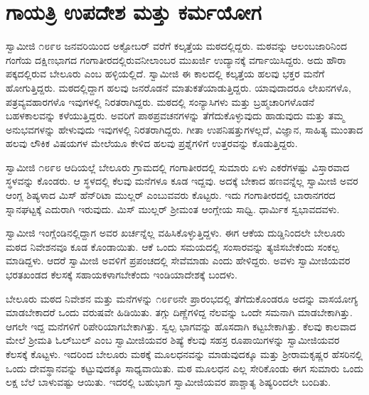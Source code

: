
\chapter{ಗಾಯತ್ರಿ ಉಪದೇಶ ಮತ್ತು ಕರ್ಮಯೋಗ}

 ಸ್ವಾಮೀಜಿ ೧೮೯೮ ಜನವರಿಯಿಂದ ಅಕ್ಟೋಬರ್ ವರೆಗೆ ಕಲ್ಕತ್ತೆಯ ಮಠದಲ್ಲಿದ್ದರು. ಮಠವನ್ನು ಆಲಂಬಜಾರಿನಿಂದ ಗಂಗೆಯ ದಕ್ಷಿಣಭಾಗದ ಗಂಗಾತೀರದಲ್ಲಿರುವ\break ನೀಲಾಂಬರ ಮುಖರ್ಜಿ ಉದ್ಯಾನಕ್ಕೆ ವರ್ಗಾಯಿಸಿದ್ದರು. ಅದು ಹೌರಾ ಪಕ್ಕದಲ್ಲಿರುವ ಬೇಲೂರು ಎಂಬ ಹಳ್ಳಿಯಲ್ಲಿದೆ. ಸ್ವಾಮೀಜಿ ಈ ಕಾಲದಲ್ಲಿ ಕಲ್ಕತ್ತೆಯ ಹಲವು ಭಕ್ತರ ಮನೆಗೆ ಹೋಗುತ್ತಿದ್ದರು. ಮಠದಲ್ಲಿದ್ದಾಗ ಹಲವು ಜನರೊಡನೆ ಮಾತುಕತೆಯಾಡುತ್ತಿದ್ದರು. ಯಾವುದಾದರೂ ಲೇಖನಗಳೊ, ಪತ್ರವ್ಯವಹಾರಗಳೊ ಇವುಗಳಲ್ಲಿ ನಿರತರಾಗಿದ್ದರು. ಮಠದಲ್ಲಿ ಸಂನ್ಯಾಸಿಗಳು ಮತ್ತು ಬ್ರಹ್ಮಚಾರಿಗಳೊಡನೆ ಬಹಳ\break ಕಾಲವನ್ನು ಕಳೆಯುತ್ತಿದ್ದರು. ಅವರಿಗೆ ಪಾಠಪ್ರವಚನಗಳನ್ನು ತೆಗೆದುಕೊಳ್ಳುವುದು ಹಾಡುವುದು ಮತ್ತು ತಮ್ಮ ಅನುಭವಗಳನ್ನು ಹೇಳುವುದು ಇವುಗಳಲ್ಲಿ ನಿರತರಾಗಿದ್ದರು. ಗೀತಾ ಉಪನಿಷತ್ತುಗಳಲ್ಲದೆ, ವಿಜ್ಞಾನ, ಸಾಹಿತ್ಯ ಮುಂತಾದ ಹಲವು ಲೌಕಿಕ ವಿಷಯಗಳ ಮೇಲೆಯೂ ಕೇಳಿದ ಹಲವು ಪ್ರಶ್ನೆಗಳಿಗೆ ಉತ್ತರವನ್ನು ಕೊಡುತ್ತಿದ್ದರು. 

 ಸ್ವಾಮೀಜಿ ೧೮೯೮ ಆದಿಯಲ್ಲೆ ಬೇಲೂರು ಗ್ರಾಮದಲ್ಲಿ ಗಂಗಾತೀರದಲ್ಲಿ ಸುಮಾರು ಏಳು ಎಕರೆಗಳಷ್ಟು ವಿಸ್ತಾರವಾದ ಸ್ಥಳವನ್ನು ಕೊಂಡರು. ಆ ಸ್ಥಳದಲ್ಲಿ ಕೆಲವು ಮನೆಗಳೂ ಕೂಡ ಇದ್ದವು. ಅದಕ್ಕೆ ಬೇಕಾದ ಹಣವನ್ನೆಲ್ಲ ಸ್ವಾಮೀಜಿ ಅವರ ಆಂಗ್ಲ ಶಿಷ್ಯಳಾದ ಮಿಸ್ ಹೆನ್‍ರಿಟಾ ಮುಲ್ಲರ್ ಎಂಬುವವರು ಕೊಟ್ಟರು. ಇದು ಗಂಗಾತೀರದಲ್ಲಿ ಬಾರಾನಗರದ ಸ್ನಾನಘಟ್ಟಕ್ಕೆ ಎದುರಾಗಿ ಇರುವುದು. ಮಿಸ್ ಮುಲ್ಲರ್ ಶ‍್ರೀಮಂತ ಆಂಗ್ಲೇಯ ಸಾಧ್ವಿ. ಧಾರ್ಮಿಕ ಸ್ವಭಾವದವಳು. 

 ಸ್ವಾಮೀಜಿ ಇಂಗ್ಲೆಂಡಿನಲ್ಲಿದ್ದಾಗ ಅವರ ಖರ್ಚನ್ನೆಲ್ಲ ವಹಿಸಿಕೊಳ್ಳುತ್ತಿದ್ದಳು. ಈಗ ಆಕೆಯ ದುಡ್ಡಿನಿಂದಲೇ‌ ಬೇಲೂರು ಮಠದ ನಿವೇಶನವೂ ಕೂಡ ಕೊಂಡಾಯಿತು. ಆಕೆ ಒಂದು ಸಮಯದಲ್ಲಿ ಸಂಸಾರವನ್ನು ತ್ಯಜಿಸಬೇಕೆಂದು ಸಂಕಲ್ಪ ಮಾಡಿದ್ದಳು. ಆದರೆ ಸ್ವಾಮೀಜಿ ಅವಳಿಗೆ ಪ್ರಪಂಚದಲ್ಲಿ ಸೇವೆಮಾಡು ಎಂದು ಹೇಳಿದ್ದರು. ಅವಳು ಸ್ವಾಮೀಜಿಯವರ ಭರತಖಂಡದ ಕೆಲಸಕ್ಕೆ ಸಹಾಯಕಳಾಗಬೇಕೆಂದು ಇಂಡಿಯಾದೇಶಕ್ಕೆ ಬಂದಳು. 

 ಬೇಲೂರು ಮಠದ ನಿವೇಶನ ಮತ್ತು ಮನೆಗಳನ್ನು ೧೮೯೮ನೇ ಪ್ರಾರಂಭದಲ್ಲಿ ತೆಗೆದುಕೊಂಡರೂ ಅದನ್ನು ವಾಸಯೋಗ್ಯ ಮಾಡಬೇಕಾದರೆ ಒಂದು ವರುಷವೇ ಹಿಡಿಯಿತು. ತಗ್ಗು ದಿಣ್ಣೆಗಳಿದ್ದ ನೆಲವನ್ನು ಒಂದೇ ಸಮನಾಗಿ ಮಾಡಬೇಕಾಗಿತ್ತು. ಆಗಲೇ ಇದ್ದ ಮನೆಗಳಿಗೆ ರಿಪೇರಿಯಾಗಬೇಕಾಗಿತ್ತು. ಸ್ವಲ್ಪ ಭಾಗವನ್ನು ಹೊಸದಾಗಿ ಕಟ್ಟಬೇಕಾಗಿತ್ತು. ಕೆಲವು ಕಾಲವಾದ ಮೇಲೆ ಶ‍್ರೀಮತಿ ಓಲ್‍ಬುಲ್ ಎಂಬ ಸ್ವಾಮೀಜಿಯವರ ಶಿಷ್ಯೆ ಕೆಲವು ಸಹಸ್ರ ರೂಪಾಯಿಗಳನ್ನು ಸ್ವಾಮೀಜಿಯವರ ಕೆಲಸಕ್ಕೆ ಕೊಟ್ಟಳು. ಇದರಿಂದ ಬೇಲೂರು ಮಠಕ್ಕೆ ಮೂಲಧನವನ್ನು ಮಾಡುವುದಕ್ಕೂ ಮತ್ತು ಶ‍್ರೀರಾಮಕೃಷ್ಣರ ಹೆಸರಿನಲ್ಲಿ ಒಂದು ದೇವಸ್ಥಾನವನ್ನು ಕಟ್ಟುವುದಕ್ಕೂ ಸಾಧ್ಯವಾಯಿತು. ಮಠ ಮೂಲಧನ ಎಲ್ಲ ಸೇರಿಕೊಂಡು ಈಗ ಸುಮಾರು ಒಂದು ಲಕ್ಷ ಬೆಲೆ ಬಾಳುವಷ್ಟು ಆಯಿತು. ಇದರಲ್ಲಿ ಬಹುಭಾಗ ಸ್ವಾಮೀಜಿಯವರ ಪಾಶ್ಚಾತ್ಯ ಶಿಷ್ಯರಿಂದಲೇ ಬಂದಿತು. 

